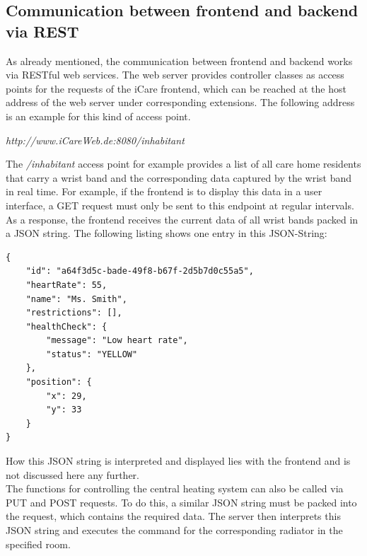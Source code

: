 \subsection{Communication between frontend and backend via REST}
As already mentioned, the communication between frontend and backend works via RESTful web services. The web server provides controller classes as access points for the requests of the iCare frontend, which can be reached at the host address of the web server under corresponding extensions. The following address is an example for this kind of access point.
\begin{center}
	\textit{http://www.iCareWeb.de:8080/inhabitant}
\end{center}
The \textit{/inhabitant} access point for example provides a list of all care home residents that carry a wrist band and the corresponding data captured by the wrist band in real time. For example, if the frontend is to display this data in a user interface, a GET request must only be sent to this endpoint at regular intervals. As a response, the frontend receives the current data of all wrist bands packed in a JSON string. The following listing shows one entry in this JSON-String:
\begin{lstlisting}
{
	"id": "a64f3d5c-bade-49f8-b67f-2d5b7d0c55a5",
	"heartRate": 55,
	"name": "Ms. Smith",
	"restrictions": [],
	"healthCheck": {
		"message": "Low heart rate",
		"status": "YELLOW"
	},
	"position": {
		"x": 29,
		"y": 33
	}
}
\end{lstlisting}
How this JSON string is interpreted and displayed lies with the frontend and is not discussed here any further.
\\
The functions for controlling the central heating system can also be called via PUT and POST requests. To do this, a similar JSON string must be packed into the request, which contains the required data. The server then interprets this JSON string and executes the command for the corresponding radiator in the specified room.

